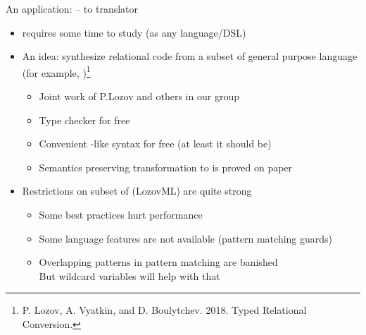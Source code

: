 \documentclass[aspectratio=169
  , xcolor={svgnames}
  , hyperref=
      { colorlinks
      , urlcolor=DarkBlue
      }
  , russian  %
  ]{beamer}
\begin{document}
\begin{frame}{An application: \noCanren{} -- \OCaml{} to \OCanren{} translator}
\begin{itemize}
\item [\faBad] \miniKanren{} requires some time to study (as any language/DSL)
\item An idea: synthesize relational code from a subset of general purpose language (for example, \OCaml{})\footnote{P. Lozov, A. Vyatkin, and D. Boulytchev. 2018. Typed Relational Conversion.}
\begin{itemize}
	\item Joint work of P.Lozov and others in our group
\item[\faGood] Type checker for free
\item[\faGood] Convenient \OCaml{}-like syntax  for free (at least it should be)
\item Semantics preserving transformation to \miniKanren{} is proved on paper
\end{itemize}
\item  Restrictions on subset of \OCaml{} (LozovML) are quite strong
\begin{itemize}
\item Some \OCaml{} best practices hurt performance
\item Some language features are not available (pattern matching guards)
\item Overlapping patterns in pattern matching are banished\\
But wildcard variables will help with that \faGood

\end{itemize}
\end{itemize}
\end{frame}

\end{document}
